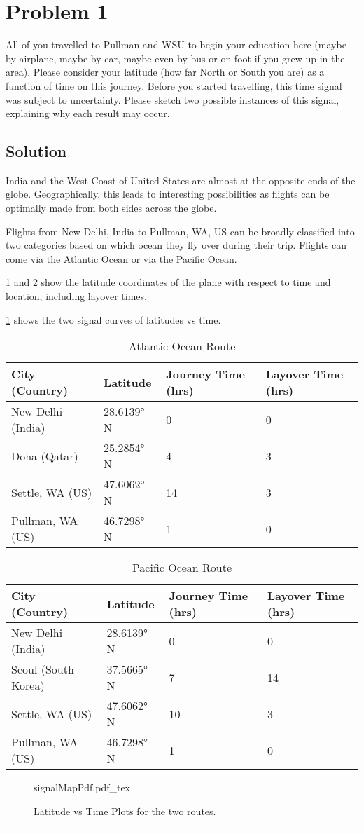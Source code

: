 \section{Problem 1}
 
 All of you travelled to Pullman and WSU to begin your education here (maybe by airplane, maybe by car, maybe even by bus or on foot if you grew up in the area). Please consider your latitude (how far North or South you are) as a function of time on this journey. Before you started travelling, this time signal was subject to uncertainty. Please sketch two possible instances of this signal, explaining why each result may occur.
 
\subsection{Solution}

India and the West Coast of United States are almost at the opposite ends of the globe. Geographically, this leads to interesting possibilities as flights can be optimally made from both sides across the globe.

Flights from New Delhi, India to Pullman, WA, US can be broadly classified into two categories based on which ocean they fly over during their trip. Flights can come via the Atlantic Ocean or via the Pacific Ocean.

\cref{tab:AtlanticRoute} and \cref{tab:pacificRoute} show the latitude coordinates of the plane with respect to time and location, including layover times.

\cref{fig:signalMaps} shows the two signal curves of latitudes vs time.

\begin{table}[h]
	\centering
	\caption{Atlantic Ocean Route}
	\label{tab:AtlanticRoute}
	\begin{tabular}{llll}
		\toprule
		City (Country) & Latitude & Journey Time (hrs) & Layover Time (hrs)\\
		\midrule
		New Delhi (India)& 28.6139° N & 0 & 0\\
		Doha (Qatar) & 25.2854° N & 4 & 3\\
		Settle, WA (US) & 47.6062° N & 14 & 3 \\
		Pullman, WA (US) & 46.7298° N & 1 & 0\\
		\bottomrule
	\end{tabular}
\end{table}

\begin{table}[h]
	\centering
	\caption{Pacific Ocean Route}
	\label{tab:pacificRoute}
	\begin{tabular}{llll}
		\toprule
		City (Country) & Latitude & Journey Time (hrs) & Layover Time (hrs)\\
		\midrule
		New Delhi (India)& 28.6139° N & 0 & 0 \\
		Seoul (South Korea) & 37.5665° N & 7 & 14 \\
		Settle, WA (US) & 47.6062° N & 10 & 3 \\
		Pullman, WA (US) & 46.7298° N & 1 & 0 \\
		\bottomrule
	\end{tabular}
\end{table}

\begin{figure}[H]
	\centering
	{signalMapPdf.pdf_tex}
	\caption{Latitude vs Time Plots for the two routes.}
	\label{fig:signalMaps}
\end{figure}

\noindent\rule{\textwidth}{1pt}
\newpage